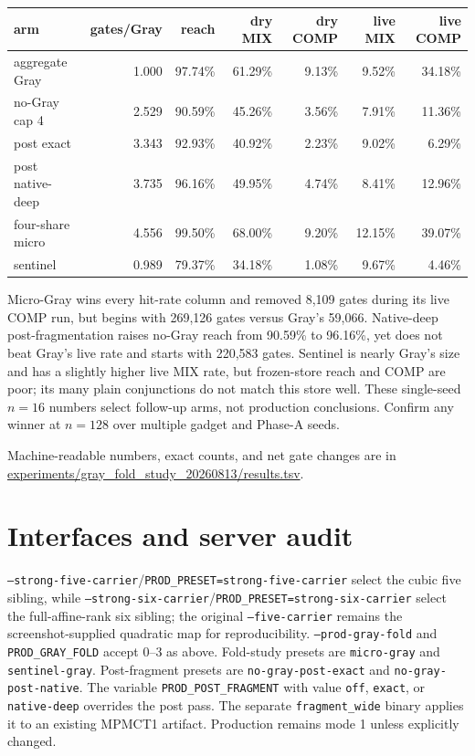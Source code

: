 \documentclass[11pt]{article}
\newcommand{\code}[1]{\texttt{#1}}
\begin{document}
\begin{center}
\begin{tabular}{@{}lrrrrrr@{}}
\toprule
arm & gates/Gray & reach & dry MIX & dry COMP & live MIX & live COMP \\
\midrule
aggregate Gray & 1.000 & 97.74\% & 61.29\% & 9.13\% & 9.52\% & 34.18\% \\
no-Gray cap 4 & 2.529 & 90.59\% & 45.26\% & 3.56\% & 7.91\% & 11.36\% \\
post exact & 3.343 & 92.93\% & 40.92\% & 2.23\% & 9.02\% & 6.29\% \\
post native-deep & 3.735 & 96.16\% & 49.95\% & 4.74\% & 8.41\% & 12.96\% \\
four-share micro & 4.556 & 99.50\% & 68.00\% & 9.20\% & 12.15\% & 39.07\% \\
sentinel & 0.989 & 79.37\% & 34.18\% & 1.08\% & 9.67\% & 4.46\% \\
\bottomrule
\end{tabular}
\end{center}

Micro-Gray wins every hit-rate column and removed 8,109 gates during its live
COMP run, but begins with 269,126 gates versus Gray's 59,066.  Native-deep
post-fragmentation raises no-Gray reach from 90.59\% to 96.16\%, yet does not
beat Gray's live rate and starts with 220,583 gates.  Sentinel is nearly Gray's
size and has a slightly higher live MIX rate, but frozen-store reach and COMP
are poor; its many plain conjunctions do not match this store well.  These
single-seed $n=16$ numbers select follow-up arms, not production conclusions.
Confirm any winner at $n=128$ over multiple gadget and Phase-A seeds.

Machine-readable numbers, exact counts, and net gate changes are in
\url{experiments/gray_fold_study_20260813/results.tsv}.

\section{Interfaces and server audit}

\code{--strong-five-carrier}/\code{PROD\_PRESET=strong-five-carrier} select
the cubic five sibling, while
\code{--strong-six-carrier}/\code{PROD\_PRESET=strong-six-carrier} select
the full-affine-rank six sibling; the original
\code{--five-carrier} remains the screenshot-supplied quadratic map for
reproducibility.  \code{--prod-gray-fold} and \code{PROD\_GRAY\_FOLD} accept 0--3 as above.
Fold-study presets are \code{micro-gray} and \code{sentinel-gray}.
Post-fragment presets are \code{no-gray-post-exact} and
\code{no-gray-post-native}.  The variable
\code{PROD\_POST\_FRAGMENT} with value \code{off}, \code{exact}, or
\code{native-deep} overrides the post pass.
The separate \code{fragment\_wide} binary applies it to an existing MPMCT1
artifact.  Production remains mode 1 unless explicitly changed.
\end{document}
